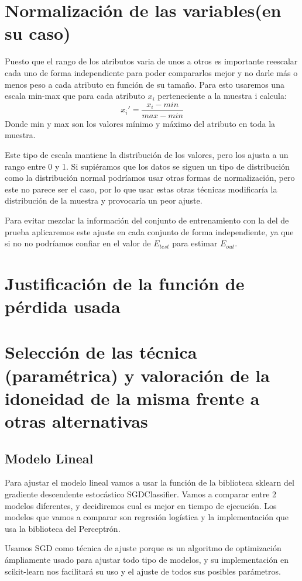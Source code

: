 \documentclass{article}
\begin{document}
	
	\section{Normalización de las variables(en su caso)} %
	Puesto que el rango de los atributos varia de unos a otros es importante reescalar cada uno de forma independiente para poder compararlos mejor y no darle más o menos peso a cada atributo en función de su tamaño. Para esto usaremos una escala min-max que para cada atributo $x_i$ perteneciente a la muestra i calcula:
\begin{equation}
x_i' = \frac{x_i-min}{max-min}
\end{equation}
\indent Donde min y max son los valores mínimo y máximo del atributo en toda la muestra.
\par 
Este tipo de escala mantiene la distribución de los valores, pero los ajusta a un rango entre 0 y 1.  Si supiéramos que los datos se siguen un tipo de distribución como la distribución normal podríamos usar otras formas de normalización, pero este no parece ser el caso, por lo que usar estas otras técnicas modificaría la distribución de la muestra y provocaría un peor ajuste.
\par 
Para evitar mezclar la información del conjunto de entrenamiento con la del de prueba aplicaremos este ajuste en cada conjunto de forma independiente, ya que si no no podríamos confiar en el valor de $E_{test}$ para estimar $E_{out}$.
	
	
	\section{Justificación de la función de pérdida usada} %
	
	
	
	\section{Selección de las técnica (paramétrica) y valoración de la idoneidad de la misma frente a otras alternativas} %
	\subsection{Modelo Lineal}
	Para ajustar el modelo lineal vamos a usar la función de la biblioteca sklearn del gradiente descendente estocástico SGDClassifier. Vamos a comparar entre 2 modelos diferentes, y decidiremos cual es mejor en tiempo de ejecución. Los modelos que vamos a comparar son regresión logística y la implementación que usa la biblioteca del Perceptrón.
	\par 
	Usamos SGD como técnica	de ajuste porque es un algoritmo de optimización ámpliamente usado para ajustar todo tipo de modelos, y su implementación en scikit-learn nos facilitará su uso y el ajuste de todos sus posibles parámetros. 
\end{document}
